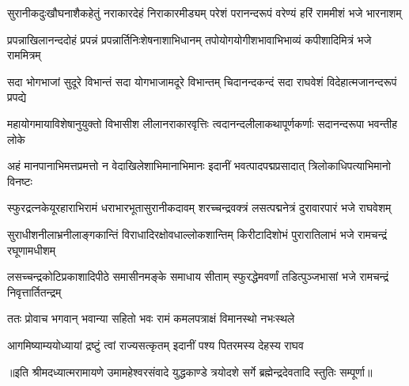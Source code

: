 \fourlineindentedshloka
{सुरानीकदुःखौघनाशैकहेतुं}
{नराकारदेहं निराकारमीड्यम्}
{परेशं परानन्दरूपं वरेण्यं}
{हरिं राममीशं भजे भारनाशम्} %

\fourlineindentedshloka
{प्रपन्नाखिलानन्ददोहं प्रपन्नं}
{प्रपन्नार्तिनिःशेषनाशाभिधानम्}
{तपोयोगयोगीशभावाभिभाव्यं}
{कपीशादिमित्रं भजे राममित्रम्} %

\fourlineindentedshloka
{सदा भोगभाजां सुदूरे विभान्तं}
{सदा योगभाजामदूरे विभान्तम्}
{चिदानन्दकन्दं सदा राघवेशं}
{विदेहात्मजानन्दरूपं प्रपद्ये} %

\fourlineindentedshloka
{महायोगमायाविशेषानुयुक्तो}
{विभासीश लीलानराकारवृत्तिः}
{त्वदानन्दलीलाकथापूर्णकर्णाः}
{सदानन्दरूपा भवन्तीह लोके} %

\fourlineindentedshloka
{अहं मानपानाभिमत्तप्रमत्तो}
{न वेदाखिलेशाभिमानाभिमानः}
{इदानीं भवत्पादपद्मप्रसादात्}
{त्रिलोकाधिपत्याभिमानो विनष्टः} %

\fourlineindentedshloka
{स्फुरद्रत्नकेयूरहाराभिरामं}
{धराभारभूतासुरानीकदावम्}
{शरच्चन्द्रवक्त्रं लसत्पद्मनेत्रं}
{दुरावारपारं भजे राघवेशम्} %

\fourlineindentedshloka
{सुराधीशनीलाभ्रनीलाङ्गकान्तिं}
{विराधादिरक्षोवधाल्लोकशान्तिम्}
{किरीटादिशोभं पुरारातिलाभं}
{भजे रामचन्द्रं रघूणामधीशम्} %

\fourlineindentedshloka
{लसच्चन्द्रकोटिप्रकाशादिपीठे}
{समासीनमङ्के समाधाय सीताम्}
{स्फुरद्धेमवर्णां तडित्पुञ्जभासां}
{भजे रामचन्द्रं निवृत्तार्तितन्द्रम्} %

\twolineshloka
{ततः प्रोवाच भगवान् भवान्या सहितो भवः}
{रामं कमलपत्राक्षं विमानस्थो नभःस्थले} %

\twolineshloka
{आगमिष्याम्ययोध्यायां द्रष्टुं त्वां राज्यसत्कृतम्}
{इदानीं पश्य पितरमस्य देहस्य राघव} %


{॥इति श्रीमदध्यात्मरामायणे उमामहेश्वरसंवादे युद्धकाण्डे त्रयोदशे  सर्गे
ब्रह्मेन्द्रदेवतादि  स्तुतिः  सम्पूर्णा॥}
